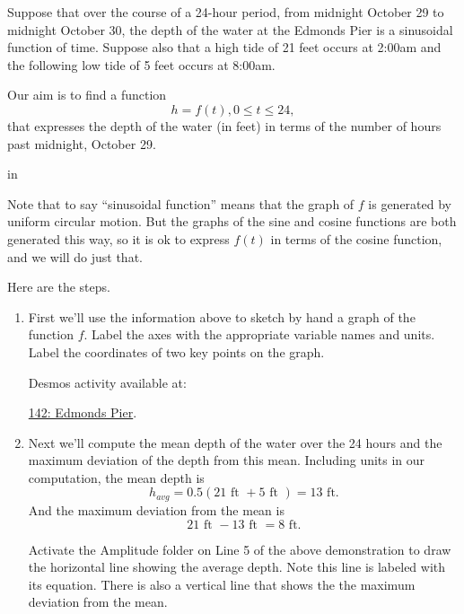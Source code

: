 \documentclass{ximera}
\newcommand{\pskip}{\vskip 0.1 in}
\begin{document}
\begin{example}  \label{E888b0bbdsdsf}
Suppose that over the course of a 24-hour period, from midnight October 29 to midnight October 30, the depth of the water at the Edmonds Pier is a sinusoidal function of time. Suppose also that a high tide of 21 feet occurs at 2:00am and the following low tide of 5 feet occurs at 8:00am. 


\begin{explanation}
Our aim is to find a function
\[
    h = f(t) , 0\leq t \leq 24, 
\]
that expresses the depth of the water (in feet) in terms of the number of hours past midnight, October 29. 

\pskip

Note that to say ``sinusoidal function'' means that the graph of $f$ is generated by uniform circular motion. But the graphs of the sine and cosine functions are both generated this way, so it is ok to express $f(t)$ in terms of the cosine function, and we will do just that.

Here are the steps.

\begin{enumerate}

\item  First we'll use the information above to sketch by hand a graph of the function $f$. Label the axes with the appropriate variable names and units. Label the coordinates of two key points on the graph.

Desmos activity available at:

\href{https://www.desmos.com/calculator/x2kocpkcfm}{142: Edmonds Pier}.

 
\begin{onlineOnly}
    \begin{center}
\end{center}
\end{onlineOnly}



\item Next we'll compute the mean depth of the water over the 24 hours and the maximum deviation of the depth from this mean. Including units in our computation, the mean depth is 
\[
    h_{avg} = 0.5 ( 21 \text{ ft } + 5 \text{ ft }) = 13 \text{ ft} . 
\]
And the maximum deviation from the mean is
\[
     21 \text{ ft } - 13 \text{ ft } = 8 \text{ ft}.
\]

Activate the Amplitude folder on Line 5 of the above demonstration to draw the horizontal line showing the average depth. Note this line is labeled with its equation. There is also a vertical line that shows the the maximum deviation from the mean.


\end{enumerate}
\end{explanation}
\end{example}
\end{document}
